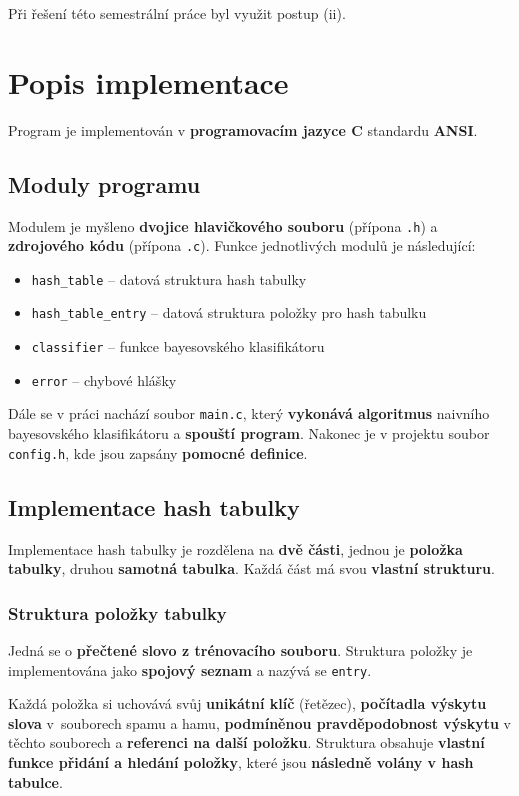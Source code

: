 \documentclass[12pt]{report}
\begin{document}
	Při řešení této semestrální práce byl využit postup (ii).
	
	\chapter{Popis implementace}
	Program je implementován v \textbf{programovacím jazyce C} standardu \textbf{ANSI}.
 	
 	\section{Moduly programu}
 	Modulem je myšleno \textbf{dvojice hlavičkového souboru} (přípona \texttt{.h}) a \textbf{zdrojového kódu} (přípona \texttt{.c}). Funkce jednotlivých modulů je následující:
 	
 	\begin{itemize}
 		\item \texttt{hash\_table} – datová struktura hash tabulky
 		\item \texttt{hash\_table\_entry} – datová struktura položky pro hash tabulku
 		\item \texttt{classifier} – funkce bayesovského klasifikátoru
 		\item \texttt{error} – chybové hlášky
 	\end{itemize}
 
 	Dále se v práci nachází soubor \texttt{main.c}, který \textbf{vykonává algoritmus} naivního bayesovského klasifikátoru a \textbf{spouští program}. Nakonec je v projektu soubor \texttt{config.h}, kde jsou zapsány \textbf{pomocné definice}. 
 	
 	\section{Implementace hash tabulky}
    Implementace hash tabulky je rozdělena na \textbf{dvě části}, jednou je \textbf{položka tabulky}, druhou \textbf{samotná tabulka}. Každá část má svou \textbf{vlastní strukturu}.
 	
 	 	\subsection{Struktura položky tabulky}
 		Jedná se o \textbf{přečtené slovo z trénovacího souboru}. Struktura položky je implementována jako \textbf{spojový seznam} a nazývá se \texttt{entry}.
 		
 		Každá položka si uchovává svůj \textbf{unikátní klíč} (řetězec), \textbf{počítadla výskytu slova} v~souborech spamu a hamu, \textbf{podmíněnou pravděpodobnost výskytu} v těchto souborech a \textbf{referenci na další položku}. Struktura obsahuje \textbf{vlastní funkce přidání a hledání položky}, které jsou \textbf{následně volány v hash tabulce}.
 		
\end{document}
